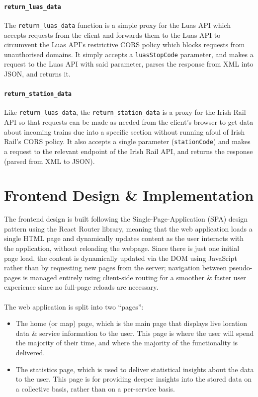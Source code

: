\documentclass[a4paper,11pt]{report}
\begin{document}
\subsubsection{\texttt{return_luas_data}}
The \verb|return_luas_data| function is a simple proxy for the Luas API which accepts requests from the client and forwards them to the Luas API to circumvent the Luas API's restrictive CORS policy which blocks requests from unauthorised domains.
It simply accepts a \verb|luasStopCode| parameter, and makes a request to the Luas API with said parameter, parses the response from XML into JSON, and returns it.

\subsubsection{\texttt{return_station_data}}
Like \verb|return_luas_data|, the \verb|return_station_data| is a proxy for the Irish Rail API so that requests can be made as needed from the client's browser to get data about incoming trains due into a specific section without running afoul of Irish Rail's CORS policy.
It also accepts a single parameter (\verb|stationCode|) and makes a request to the relevant endpoint of the Irish Rail API, and returns the response (parsed from XML to JSON).


\chapter{Frontend Design \& Implementation}
The frontend design is built following the Single-Page-Application (SPA)\supercite{spa} design pattern using the React Router\supercite{reactrouter} library, meaning that the web application loads a single HTML page and dynamically updates content as the user interacts with the application, without reloading the webpage. 
Since there is just one initial page load, the content is dynamically updated via the DOM using JavaSript rather than by requesting new pages from the server;
navigation between pseudo-pages is managed entirely using client-side routing for a smoother \& faster user experience since no full-page reloads are necessary.
\\\\
The web application is split into two ``pages'':
\begin{itemize}
  \item   The home (or map) page, which is the main page that displays live location data \& service information to the user.
          This page is where the user will spend the majority of their time, and where the majority of the functionality is delivered.
  \item   The statistics page, which is used to deliver statistical insights about the data to the user.
          This page is for providing deeper insights into the stored data on a collective basis, rather than on a per-service basis.
\end{itemize}
\end{document}
